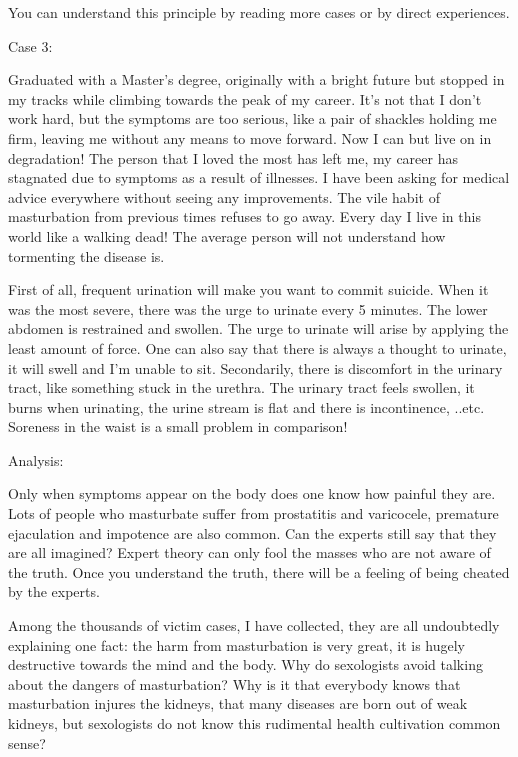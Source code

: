 \documentclass[
]{book}
\begin{document}
You can understand this principle by reading more cases or by direct experiences.

Case 3:

Graduated with a Master's degree, originally with a bright future but stopped in my tracks while climbing towards the peak of my career. It's not that I don't work hard, but the symptoms are too serious, like a pair of shackles holding me firm, leaving me without any means to move forward. Now I can but live on in degradation! The person that I loved the most has left me, my career has stagnated due to symptoms as a result of illnesses. I have been asking for medical advice everywhere without seeing any improvements. The vile habit of masturbation from previous times refuses to go away. Every day I live in this world like a walking dead! The average person will not understand how tormenting the disease is.

First of all, frequent urination will make you want to commit suicide. When it was the most severe, there was the urge to urinate every 5 minutes. The lower abdomen is restrained and swollen. The urge to urinate will arise by applying the least amount of force. One can also say that there is always a thought to urinate, it will swell and I'm unable to sit. Secondarily, there is discomfort in the urinary tract, like something stuck in the urethra. The urinary tract feels swollen, it burns when urinating, the urine stream is flat and there is incontinence, ..etc. Soreness in the waist is a small problem in comparison!

Analysis:

Only when symptoms appear on the body does one know how painful they are. Lots of people who masturbate suffer from prostatitis and varicocele, premature ejaculation and impotence are also common. Can the experts still say that they are all imagined? Expert theory can only fool the masses who are not aware of the truth. Once you understand the truth, there will be a feeling of being cheated by the experts.

Among the thousands of victim cases, I have collected, they are all undoubtedly explaining one fact: the harm from masturbation is very great, it is hugely destructive towards the mind and the body. Why do sexologists avoid talking about the dangers of masturbation? Why is it that everybody knows that masturbation injures the kidneys, that many diseases are born out of weak kidneys, but sexologists do not know this rudimental health cultivation common sense?
\end{document}
